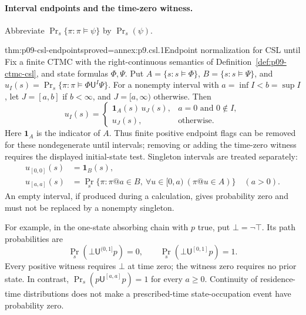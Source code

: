 \paragraph{Interval endpoints and the time-zero witness.}
\label{sec:p09-csl-endpoints}
Abbreviate \(\Pr_s\{\pi:\pi\models\psi\}\) by \(\Pr_s(\psi)\).
\begin{hbtheorem}{thm:p09-csl-endpoints}{proved=annex:p9.csl.1}{Endpoint normalization for CSL until}
Fix a finite CTMC with the right-continuous semantics of
Definition~\ref{def:p09-ctmc-csl}, and state formulas \(\Phi,\Psi\).  Put
\(A=\{s:s\models\Phi\}\), \(B=\{s:s\models\Psi\}\), and
\(u_I(s)=\Pr_s\{\pi:\pi\models\Phi\mathbin{\mathsf U^I}\Psi\}\).
For a nonempty interval with \(a=\inf I<b=\sup I\), let \(J=[a,b]\)
if \(b<\infty\), and \(J=[a,\infty)\) otherwise.  Then
\[
 u_I(s)=
 \begin{cases}
  \mathbf 1_A(s)\,u_J(s),&a=0\text{ and }0\notin I,\\
  u_J(s),&\text{otherwise}.
 \end{cases}
\]
Here \(\mathbf 1_A\) is the indicator of \(A\).  Thus finite positive
endpoint flags can be removed for these nondegenerate until intervals;
removing or adding the time-zero witness requires the displayed initial-state
test.  Singleton intervals are treated separately:
\[
 \begin{aligned}
  u_{[0,0]}(s)&=\mathbf 1_B(s),\\
  u_{[a,a]}(s)&=
   \Pr_s\{\pi:\pi@a\in B,\ \forall u\in[0,a)\ (\pi@u\in A)\}
   \quad(a>0).
 \end{aligned}
\]
An empty interval, if produced during a calculation, gives probability zero
and must not be replaced by a nonempty singleton.

\end{hbtheorem}

For example, in the one-state absorbing chain with \(p\) true, put
\(\bot=\neg\top\).  Its path probabilities are
\[
 \Pr_s(\bot\mathbin{\mathsf U^{(0,1]}}p)=0,
 \qquad
 \Pr_s(\bot\mathbin{\mathsf U^{[0,1]}}p)=1.
\]
Every positive witness requires \(\bot\) at time zero; the witness zero
requires no prior state.  In contrast,
\(\Pr_s(p\mathbin{\mathsf U^{[a,a]}}p)=1\) for every \(a\geq0\).
Continuity of residence-time distributions does not make a prescribed-time
state-occupation event have probability zero.

